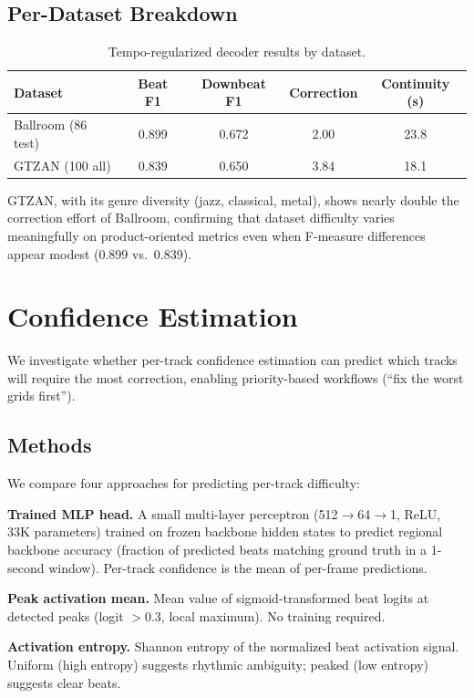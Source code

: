 \documentclass[a4paper]{article}
\begin{document}
\subsection{Per-Dataset Breakdown}

\begin{table}[h]
\centering
\caption{Tempo-regularized decoder results by dataset.}
\label{tab:perdataset}
\begin{tabular}{lcccc}
\toprule
Dataset & Beat F1 & Downbeat F1 & Correction & Continuity (s) \\
\midrule
Ballroom (86 test) & 0.899 & 0.672 & 2.00 & 23.8 \\
GTZAN (100 all) & 0.839 & 0.650 & 3.84 & 18.1 \\
\bottomrule
\end{tabular}
\end{table}

GTZAN, with its genre diversity (jazz, classical, metal), shows nearly double
the correction effort of Ballroom, confirming that dataset difficulty varies
meaningfully on product-oriented metrics even when F-measure differences appear modest (0.899 vs.\ 0.839).

\section{Confidence Estimation}\label{sec:confidence}

We investigate whether per-track confidence estimation can predict which tracks
will require the most correction, enabling priority-based workflows
(``fix the worst grids first'').

\subsection{Methods}

We compare four approaches for predicting per-track difficulty:

\textbf{Trained MLP head.}
A small multi-layer perceptron (512$\to$64$\to$1, ReLU, 33K parameters)
trained on frozen backbone hidden states to predict regional backbone accuracy
(fraction of predicted beats matching ground truth in a 1-second window).
Per-track confidence is the mean of per-frame predictions.

\textbf{Peak activation mean.}
Mean value of sigmoid-transformed beat logits at detected peaks (logit $> 0.3$, local maximum).
No training required.

\textbf{Activation entropy.}
Shannon entropy of the normalized beat activation signal.
Uniform (high entropy) suggests rhythmic ambiguity; peaked (low entropy) suggests clear beats.
\end{document}
